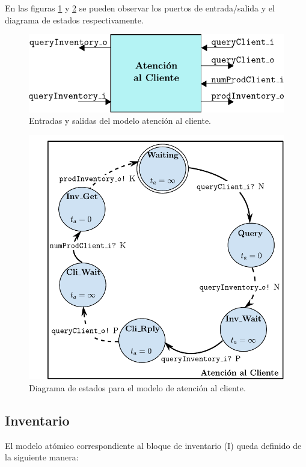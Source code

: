 \documentclass[10pt]{article}
\begin{document}
En las figuras \ref{fig:AC-esquematico} y \ref{fig:AC-estados} se pueden observar los puertos de entrada/salida y el diagrama de estados respectivamente.

\begin{figure}[htbp]
	\centering
	\includegraphics{img/AC-esquematico}
	\caption{Entradas y salidas del modelo atención al cliente.}
	\label{fig:AC-esquematico}
\end{figure}

\begin{figure}[htbp]
	\centering
	\includegraphics{img/atencionClientedevsgraph}
	\caption{Diagrama de estados para el modelo de atención al cliente.}
	\label{fig:AC-estados}
\end{figure}

\subsection{Inventario\label{sec:I}}
El modelo atómico correspondiente al bloque de inventario (I) queda definido de la siguiente manera:
\end{document}
